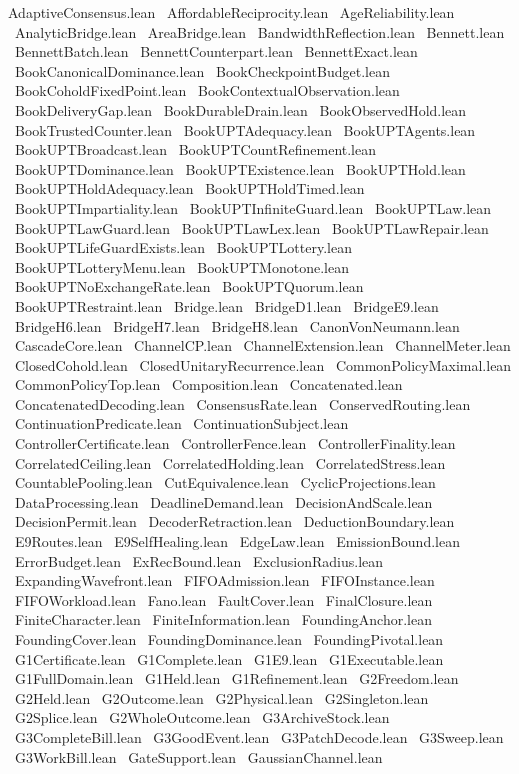 AdaptiveConsensus.lean \
AffordableReciprocity.lean \
AgeReliability.lean \
AnalyticBridge.lean \
AreaBridge.lean \
BandwidthReflection.lean \
Bennett.lean \
BennettBatch.lean \
BennettCounterpart.lean \
BennettExact.lean \
BookCanonicalDominance.lean \
BookCheckpointBudget.lean \
BookCoholdFixedPoint.lean \
BookContextualObservation.lean \
BookDeliveryGap.lean \
BookDurableDrain.lean \
BookObservedHold.lean \
BookTrustedCounter.lean \
BookUPTAdequacy.lean \
BookUPTAgents.lean \
BookUPTBroadcast.lean \
BookUPTCountRefinement.lean \
BookUPTDominance.lean \
BookUPTExistence.lean \
BookUPTHold.lean \
BookUPTHoldAdequacy.lean \
BookUPTHoldTimed.lean \
BookUPTImpartiality.lean \
BookUPTInfiniteGuard.lean \
BookUPTLaw.lean \
BookUPTLawGuard.lean \
BookUPTLawLex.lean \
BookUPTLawRepair.lean \
BookUPTLifeGuardExists.lean \
BookUPTLottery.lean \
BookUPTLotteryMenu.lean \
BookUPTMonotone.lean \
BookUPTNoExchangeRate.lean \
BookUPTQuorum.lean \
BookUPTRestraint.lean \
Bridge.lean \
BridgeD1.lean \
BridgeE9.lean \
BridgeH6.lean \
BridgeH7.lean \
BridgeH8.lean \
CanonVonNeumann.lean \
CascadeCore.lean \
ChannelCP.lean \
ChannelExtension.lean \
ChannelMeter.lean \
ClosedCohold.lean \
ClosedUnitaryRecurrence.lean \
CommonPolicyMaximal.lean \
CommonPolicyTop.lean \
Composition.lean \
Concatenated.lean \
ConcatenatedDecoding.lean \
ConsensusRate.lean \
ConservedRouting.lean \
ContinuationPredicate.lean \
ContinuationSubject.lean \
ControllerCertificate.lean \
ControllerFence.lean \
ControllerFinality.lean \
CorrelatedCeiling.lean \
CorrelatedHolding.lean \
CorrelatedStress.lean \
CountablePooling.lean \
CutEquivalence.lean \
CyclicProjections.lean \
DataProcessing.lean \
DeadlineDemand.lean \
DecisionAndScale.lean \
DecisionPermit.lean \
DecoderRetraction.lean \
DeductionBoundary.lean \
E9Routes.lean \
E9SelfHealing.lean \
EdgeLaw.lean \
EmissionBound.lean \
ErrorBudget.lean \
ExRecBound.lean \
ExclusionRadius.lean \
ExpandingWavefront.lean \
FIFOAdmission.lean \
FIFOInstance.lean \
FIFOWorkload.lean \
Fano.lean \
FaultCover.lean \
FinalClosure.lean \
FiniteCharacter.lean \
FiniteInformation.lean \
FoundingAnchor.lean \
FoundingCover.lean \
FoundingDominance.lean \
FoundingPivotal.lean \
G1Certificate.lean \
G1Complete.lean \
G1E9.lean \
G1Executable.lean \
G1FullDomain.lean \
G1Held.lean \
G1Refinement.lean \
G2Freedom.lean \
G2Held.lean \
G2Outcome.lean \
G2Physical.lean \
G2Singleton.lean \
G2Splice.lean \
G2WholeOutcome.lean \
G3ArchiveStock.lean \
G3CompleteBill.lean \
G3GoodEvent.lean \
G3PatchDecode.lean \
G3Sweep.lean \
G3WorkBill.lean \
GateSupport.lean \
GaussianChannel.lean \
